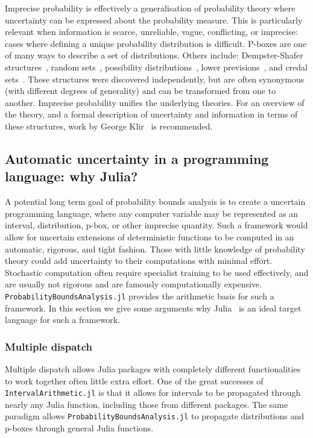 \documentclass{juliacon}
\begin{document}
Imprecise probability is effectively a generalisation of probability theory where uncertainty can be expressed about the probability measure. This is particularly relevant when information is scarce, unreliable, vague, conflicting, or imprecise: cases where defining a unique probability distribution is difficult. P-boxes are one of many ways to describe a set of distributions. Others include: Dempster-Shafer structures~\cite{dempster2008upper,shafer1976mathematical}, random sets~\cite{molchanov2005theory}, possibility distributions~\cite{zadeh1978fuzzy,dubois1988possibility, hose2019possibilistic}, lower previsions~\cite{troffaes2014lower}, and credal sets~\cite{levi1983enterprise}. These structures were discovered independently, but are often synonymous (with different degrees of generality) and can be transformed from one to another. Imprecise probability unifies the underlying theories. For an overview of the theory, and a formal description of uncertainty and information in terms of these structures, work by George Klir~\cite{klir2013uncertainty} is recommended.
\subsection{Automatic uncertainty in a programming language: why Julia?}
A potential long term goal of probability bounds analysis is to create a uncertain programming language, where any computer variable may be represented as an interval, distribution, p-box, or other imprecise quantity. Such a framework would allow for uncertain extensions of deterministic functions to be computed in an automatic, rigorous, and tight fashion. Those with little knowledge of probability theory could add uncertainty to their computations with minimal effort. Stochastic computation often require specialist training to be used effectively, and are usually not rigorous and are famously computationally expensive. \texttt{ProbabilityBoundsAnalysis.jl} provides the arithmetic basis for such a framework. In this section we give some arguments why Julia~\cite{bezanson2017julia} is an ideal target language for such a framework.

\subsubsection{Multiple dispatch}
Multiple dispatch allows Julia packages with completely different functionalities to work together often little extra effort. One of the great successes of \texttt{IntervalArithmetic.jl} is that it allows for intervals to be propagated through nearly any Julia function, including those from different packages. The same paradigm allows \texttt{ProbabilityBoundsAnalysis.jl} to propagate distributions and p-boxes through general Julia functions.
\end{document}
